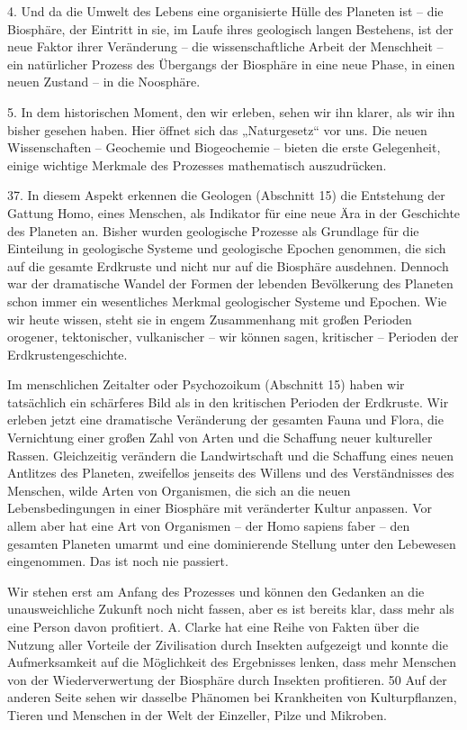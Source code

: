 \documentclass[11pt,a4paper]{book}
\begin{document}
    4. Und da die Umwelt des Lebens eine organisierte Hülle des Planeten ist -- die Biosphäre, der Eintritt in sie, im Laufe ihres geologisch langen Bestehens, ist der neue Faktor ihrer Veränderung -- die wissenschaftliche Arbeit der Menschheit -- ein natürlicher Prozess des Übergangs der Biosphäre in eine neue Phase, in einen neuen Zustand -- in die Noosphäre. 

    5. In dem historischen Moment, den wir erleben, sehen wir ihn klarer, als wir ihn bisher gesehen haben. Hier öffnet sich das „Naturgesetz“ vor uns. Die neuen Wissenschaften -- Geochemie und Biogeochemie -- bieten die erste Gelegenheit, einige wichtige Merkmale des Prozesses mathematisch auszudrücken. 

37. In diesem Aspekt erkennen die Geologen (Abschnitt 15) die Entstehung der Gattung Homo, eines Menschen, als Indikator für eine neue Ära in der Geschichte des Planeten an. Bisher wurden geologische Prozesse als Grundlage für die Einteilung in geologische Systeme und geologische Epochen genommen, die sich auf die gesamte Erdkruste und nicht nur auf die Biosphäre ausdehnen. Dennoch war der dramatische Wandel der Formen der lebenden Bevölkerung des Planeten schon immer ein wesentliches Merkmal geologischer Systeme und Epochen. Wie wir heute wissen, steht sie in engem Zusammenhang mit großen Perioden orogener, tektonischer, vulkanischer -- wir können sagen, kritischer -- Perioden der Erdkrustengeschichte. 

Im menschlichen Zeitalter oder Psychozoikum (Abschnitt 15) haben wir tatsächlich ein schärferes Bild als in den kritischen Perioden der Erdkruste. Wir erleben jetzt eine dramatische Veränderung der gesamten Fauna und Flora, die Vernichtung einer großen Zahl von Arten und die Schaffung neuer kultureller Rassen. Gleichzeitig verändern die Landwirtschaft und die Schaffung eines neuen Antlitzes des Planeten, zweifellos jenseits des Willens und des Verständnisses des Menschen, wilde Arten von Organismen, die sich an die neuen Lebensbedingungen in einer Biosphäre mit veränderter Kultur anpassen. Vor allem aber hat eine Art von Organismen -- der Homo sapiens faber -- den gesamten Planeten umarmt und eine dominierende Stellung unter den Lebewesen eingenommen. Das ist noch nie passiert. 

Wir stehen erst am Anfang des Prozesses und können den Gedanken an die unausweichliche Zukunft noch nicht fassen, aber es ist bereits klar, dass mehr als eine Person davon profitiert. A. Clarke hat eine Reihe von Fakten über die Nutzung aller Vorteile der Zivilisation durch Insekten aufgezeigt und konnte die Aufmerksamkeit auf die Möglichkeit des Ergebnisses lenken, dass mehr Menschen von der Wiederverwertung der Biosphäre durch Insekten profitieren. 50 Auf der anderen Seite sehen wir dasselbe Phänomen bei Krankheiten von Kulturpflanzen, Tieren und Menschen in der Welt der Einzeller, Pilze und Mikroben. 
\end{document}
